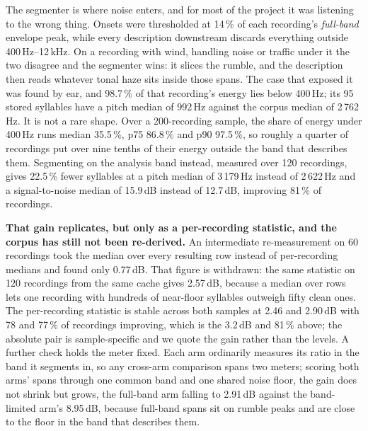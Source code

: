 \documentclass[10pt,twocolumn,a4paper]{article}
\begin{document}
The segmenter is where noise enters, and for most of the project it was listening to the
wrong thing. Onsets were thresholded at 14\,\% of each recording's \emph{full-band} envelope
peak, while every description downstream discards everything outside 400\,Hz--12\,kHz. On a
recording with wind, handling noise or traffic under it the two disagree and the segmenter
wins: it slices the rumble, and the description then reads whatever tonal haze sits inside
those spans. The case that exposed it was found by ear, and 98.7\,\% of that recording's
energy lies below 400\,Hz; its 95 stored syllables have a pitch median of 992\,Hz against the
corpus median of 2\,762\,Hz. It is not a rare shape. Over a 200-recording sample, the share of
energy under 400\,Hz runs median 35.5\,\%, p75 86.8\,\% and p90 97.5\,\%, so roughly a quarter
of recordings put over nine tenths of their energy outside the band that describes them.
Segmenting on the analysis band instead, measured over 120 recordings, gives 22.5\,\% fewer
syllables at a pitch median of 3\,179\,Hz instead of 2\,622\,Hz and a signal-to-noise median
of 15.9\,dB instead of 12.7\,dB, improving 81\,\% of recordings.

\textbf{That gain replicates, but only as a per-recording statistic, and the corpus has still
not been re-derived.} An intermediate re-measurement on 60 recordings took the median over
every resulting row instead of per-recording medians and found only 0.77\,dB. That figure is
withdrawn: the same statistic on 120 recordings from the same cache gives 2.57\,dB, because a
median over rows lets one recording with hundreds of near-floor syllables outweigh fifty clean
ones. The per-recording statistic is stable across both samples at 2.46 and 2.90\,dB with 78
and 77\,\% of recordings improving, which is the 3.2\,dB and 81\,\% above; the absolute pair is
sample-specific and we quote the gain rather than the levels. A further check holds the meter
fixed. Each arm ordinarily measures its ratio in the band it segments in, so any cross-arm
comparison spans two meters; scoring both arms' spans through one common band and one shared
noise floor, the gain does not shrink but grows, the full-band arm falling to 2.91\,dB against
the band-limited arm's 8.95\,dB, because full-band spans sit on rumble peaks and are close to
the floor in the band that describes them.
\end{document}
